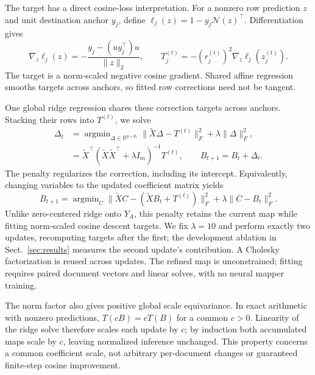 The target has a direct cosine-loss interpretation. For a nonzero row
prediction $z$ and unit destination anchor $y_j$, define
$\ell_j(z)=1-y_j\mathcal N(z)^\top$. Differentiation gives
\begin{equation}
 \nabla_z\ell_j(z)=-\frac{y_j-(uy_j^\top)u}{\|z\|_2},
 \qquad T_j^{(t)}=-(r_j^{(t)})^2\nabla_z\ell_j(z_j^{(t)}).
 \label{eq:cosine-target}
\end{equation}
The target is a norm-scaled negative cosine gradient. Shared affine regression
smooths targets across anchors, so fitted row corrections need not be tangent.

One global ridge regression shares these correction targets across anchors.
Stacking their rows into $T^{(t)}$, we solve
\begin{align}
 \Delta_t&=\mathop{\arg\min}_{\Delta\in\mathbb{R}^{p\times d_t}}
 \|\widetilde{X}\Delta-T^{(t)}\|_F^2+\lambda\|\Delta\|_F^2,
 \label{eq:ridge-objective}\\
 &=\widetilde{X}^{\top}
 (\widetilde{X}\widetilde{X}^{\top}+\lambda I_m)^{-1}T^{(t)},
 \qquad B_{t+1}=B_t+\Delta_t .
 \label{eq:tangent-update}
\end{align}
The penalty regularizes the correction, including its intercept. Equivalently,
changing variables to the updated coefficient matrix yields
\begin{equation}
 B_{t+1}=\mathop{\arg\min}_C
 \|\widetilde X C-(\widetilde X B_t+T^{(t)})\|_F^2
 +\lambda\|C-B_t\|_F^2.
 \label{eq:current-prior}
\end{equation}
Unlike zero-centered ridge onto $Y_A$, this penalty retains the current map
while fitting norm-scaled cosine descent targets. We fix $\lambda=10$ and perform
exactly two updates, recomputing targets after the first; the development
ablation in Sect.~\ref{sec:results} measures the second update's contribution.
A Cholesky
factorization is reused across updates. The refined map is unconstrained;
fitting requires paired document vectors and linear solves, with no neural
mapper training.

The norm factor also gives positive global scale equivariance. In exact
arithmetic with nonzero predictions, $T(cB)=cT(B)$ for a common $c>0$.
Linearity of the ridge solve therefore scales each update by $c$; by
induction both accumulated maps scale by $c$, leaving normalized inference
unchanged. This property concerns a common coefficient scale, not arbitrary
per-document changes or guaranteed finite-step cosine improvement.

